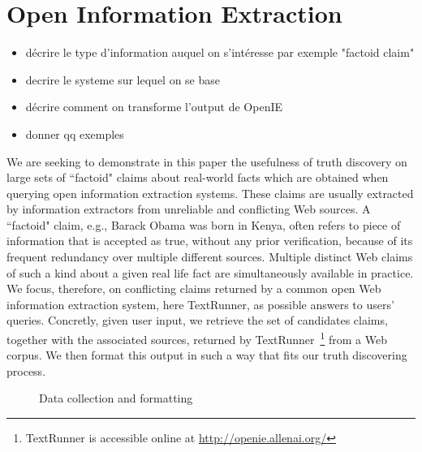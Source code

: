 \section{Open Information Extraction}
\begin{itemize}
 \item décrire le type d'information auquel on s'intéresse par exemple "factoid claim"
 \item decrire le systeme sur lequel on se base
 \item décrire comment on transforme l'output de OpenIE
 \item donner qq exemples
\end{itemize}

\medskip

We are seeking to demonstrate in this paper the usefulness of truth discovery on large sets of 
``factoid" claims about real-world facts which are obtained when querying open information extraction
systems. These claims are usually extracted by information extractors from unreliable and conflicting 
Web sources.
A ``factoid" claim, e.g.,  \textsf{Barack Obama was born in Kenya}, often refers to piece of 
information that is accepted as true, without any prior verification, because of its frequent redundancy
over multiple different sources. Multiple distinct Web claims of such a kind about a given real life fact 
are simultaneously available in practice. We focus, therefore, on conflicting claims returned by a common
open Web information extraction system, here TextRunner, as possible answers to users' queries. Concretly, given user input, we retrieve the set of candidates claims, together with the associated
sources, returned by TextRunner~\footnote{TextRunner is accessible online at \href{http://openie.allenai.o, rg/}{http://openie.allenai.org/}}
from a Web corpus. We then format this output in such a way that fits our truth discovering process.


\begin{figure*}[!ht]
\begin{subfigure}[TextRunner Extraction]{Un exemple d'extraction avec TextRunner}
\end{subfigure}
\hfill
\begin{subfigure}[Extracted Triplets]{Un exemple de tripl\'es extraites}
\end{subfigure}
\label{open}\caption{Data collection and formatting}
\end{figure*}

